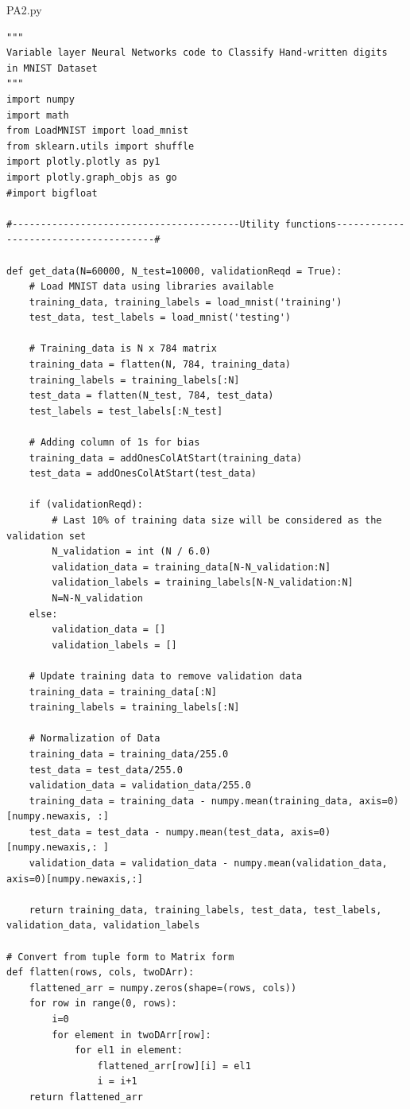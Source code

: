 \documentclass{article}
\begin{document}
PA2.py
\begin{lstlisting}
"""
Variable layer Neural Networks code to Classify Hand-written digits
in MNIST Dataset
"""
import numpy
import math
from LoadMNIST import load_mnist
from sklearn.utils import shuffle
import plotly.plotly as py1
import plotly.graph_objs as go
#import bigfloat

#----------------------------------------Utility functions--------------------------------------#

def get_data(N=60000, N_test=10000, validationReqd = True):
    # Load MNIST data using libraries available
    training_data, training_labels = load_mnist('training')    
    test_data, test_labels = load_mnist('testing')
    
    # Training_data is N x 784 matrix
    training_data = flatten(N, 784, training_data) 
    training_labels = training_labels[:N]
    test_data = flatten(N_test, 784, test_data)
    test_labels = test_labels[:N_test]

    # Adding column of 1s for bias
    training_data = addOnesColAtStart(training_data)
    test_data = addOnesColAtStart(test_data)
    
    if (validationReqd):
        # Last 10% of training data size will be considered as the validation set
        N_validation = int (N / 6.0)
        validation_data = training_data[N-N_validation:N]
        validation_labels = training_labels[N-N_validation:N]
        N=N-N_validation
    else:
        validation_data = []
        validation_labels = []
    
    # Update training data to remove validation data
    training_data = training_data[:N]
    training_labels = training_labels[:N]    

    # Normalization of Data
    training_data = training_data/255.0
    test_data = test_data/255.0
    validation_data = validation_data/255.0
    training_data = training_data - numpy.mean(training_data, axis=0)[numpy.newaxis, :]
    test_data = test_data - numpy.mean(test_data, axis=0)[numpy.newaxis,: ]
    validation_data = validation_data - numpy.mean(validation_data, axis=0)[numpy.newaxis,:]
    
    return training_data, training_labels, test_data, test_labels, validation_data, validation_labels
    
# Convert from tuple form to Matrix form
def flatten(rows, cols, twoDArr):
    flattened_arr = numpy.zeros(shape=(rows, cols))
    for row in range(0, rows):
        i=0
        for element in twoDArr[row]:
            for el1 in element:
                flattened_arr[row][i] = el1
                i = i+1
    return flattened_arr


\end{lstlisting}
\end{document}
